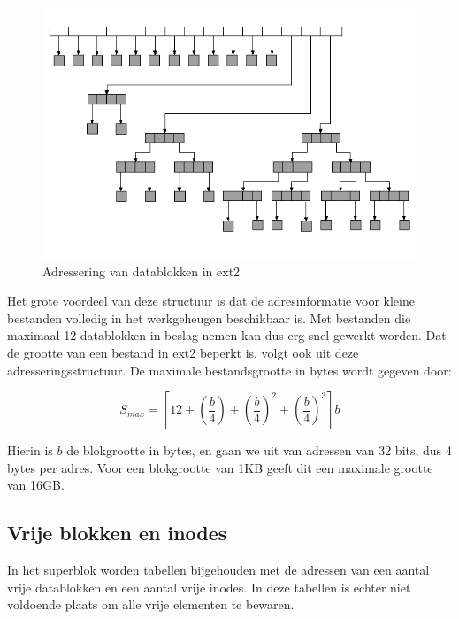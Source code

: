 \begin{figure}
\begin{center}
\includegraphics[width=120mm]{images/fig0419.png}
\caption{Adressering van datablokken in ext2}
\label{extAdressering}
\end{center}
\end{figure}

Het grote voordeel van deze structuur is dat de adresinformatie voor kleine bestanden volledig in het werkgeheugen
beschikbaar is. Met bestanden die maximaal 12 datablokken in beslag nemen kan dus erg snel gewerkt worden. Dat de
grootte van een bestand in ext2 beperkt is, volgt ook uit deze adresseringsstructuur. De maximale bestandsgrootte
in bytes wordt gegeven door:

\begin{displaymath}
S_{max} = \left[12 + \left(\frac{b}{4}\right) + \left(\frac{b}{4}\right)^{2} + \left(\frac{b}{4}\right)^{3}\right]b
\end{displaymath}



Hierin is $b$ de blokgrootte in bytes, en gaan we uit van adressen van 32 bits, dus 4 bytes per adres. Voor een
blokgrootte van 1KB geeft dit een maximale grootte van 16GB.

\subsection{Vrije blokken en inodes}

In het superblok worden tabellen bijgehouden met de adressen van een aantal vrije datablokken en een aantal vrije
inodes. In deze tabellen is echter niet voldoende plaats om alle vrije elementen te bewaren.

